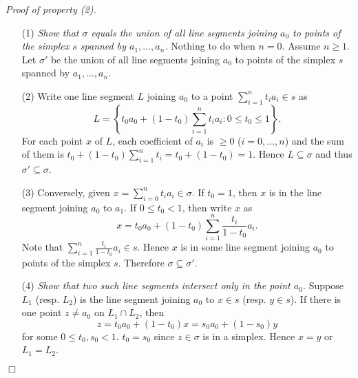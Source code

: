 \documentclass{article}
\begin{document}
\emph{Proof of property (2).}
\begin{enumerate}
\item[(1)]
  \emph{Show that $\sigma$ equals the union of all line segments joining $a_0$ to
  points of the simplex $s$ spanned by $a_1, \ldots, a_n$.}
  Nothing to do when $n = 0$.
  Assume $n \geq 1$.
  Let $\sigma'$ be the union of all line segments joining $a_0$ to
  points of the simplex $s$ spanned by $a_1, \ldots, a_n$.

\item[(2)]
  Write one line segment $L$
  joining $a_0$ to a point $\sum_{i=1}^{n} t_i a_i \in s$ as
  \[
    L
    =
    \left\{ t_0 a_0 + (1-t_0) \sum_{i=1}^{n} t_i a_i : 0 \leq t_0 \leq 1 \right\}.
  \]
  For each point $x$ of $L$, each coefficient of $a_i$ is $\geq 0$ ($i = 0, \ldots, n$)
  and the sum of them is $t_0 + (1-t_0) \sum_{i=1}^{n} t_i = t_0 + (1-t_0) = 1$.
  Hence $L \subseteq \sigma$ and thus $\sigma' \subseteq \sigma$.

\item[(3)]
  Conversely, given $x = \sum_{i=0}^{n} t_i a_i \in \sigma$.
  If $t_0 = 1$, then $x$ is in the line segment joining $a_0$ to $a_1$.
  If $0 \leq t_0 < 1$, then write $x$ as
  \[
    x = t_0 a_0 + (1-t_0) \sum_{i=1}^{n} \frac{t_i}{1-t_0} a_i.
  \]
  Note that $\sum_{i=1}^{n} \frac{t_i}{1-t_0} a_i \in s$.
  Hence $x$ is in some line segment joining $a_0$ to points of the simplex $s$.
  Therefore $\sigma \subseteq \sigma'$.

\item[(4)]
  \emph{Show that two such line segments intersect only in the point $a_0$.}
  Suppose $L_1$ (resp. $L_2$) is the line segment joining $a_0$ to $x \in s$ (resp. $y \in s$).
  If there is one point $z \neq a_0$ on $L_1 \cap L_2$, then
  \[
    z
    = t_0 a_0 + (1-t_0) x
    = s_0 a_0 + (1-s_0) y
  \]
  for some $0 \leq t_0, s_0 < 1$.
  $t_0 = s_0$ since $z \in \sigma$ is in a simplex.
  Hence $x = y$ or $L_1 = L_2$.
\end{enumerate}
$\Box$ \\
\end{document}
